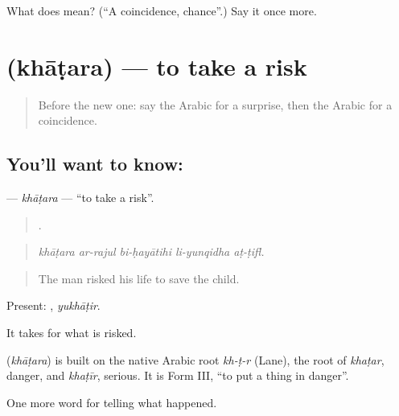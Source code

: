 \begin{tcolorbox}[breakable,colback=teal!4,colframe=teal!35!black,title={Before you move on}]
What does  mean? (\textquotedblleft{}A coincidence, chance\textquotedblright{}.) Say it once more.
\end{tcolorbox}
\section[\texorpdfstring{\ar{خاطر} (khāṭara)}{خاطر (khāṭara)}]{ (khāṭara) — to take a risk}

\label{lesson:AR-C343-khatara}



\begin{quote}
Before the new one: say the Arabic for a surprise, then the Arabic for a coincidence.
\end{quote}

\subsection*{You'll want to know: }
\textbf{} — \emph{khāṭara} — \textquotedblleft{}to take a risk\textquotedblright{}.

\begin{quote}
    .
\end{quote}

\begin{quote}
\emph{khāṭara ar-rajul bi-ḥayātihi li-yunqidha aṭ-ṭifl.}
\end{quote}

\begin{quote}
The man risked his life to save the child.
\end{quote}

Present: , \emph{yukhāṭir}.

It takes  for what is risked.

\begin{cousinweb}
\textbf{} (\emph{khāṭara}) is built on the native Arabic root \emph{kh-ṭ-r} (Lane), the root of \emph{khaṭar}, danger, and \emph{khaṭīr}, serious. It is Form III, \textquotedblleft{}to put a thing in danger\textquotedblright{}.
\end{cousinweb}

\begin{grammarlens}[title={What you've built}]
One more word for telling what happened.
\end{grammarlens}


